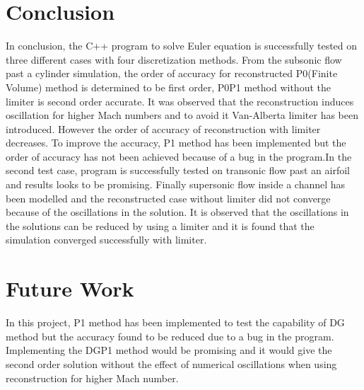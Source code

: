 \documentclass[12pt]{elsarticle}
\begin{document}
	\clearpage
	\section{Conclusion}
	In conclusion, the C++ program to solve Euler equation is successfully tested on three different cases with four discretization methods. From the subsonic flow past a cylinder simulation, the order of accuracy for reconstructed P0(Finite Volume) method is determined to be first order, P0P1 method without the limiter is second order accurate. It was observed that the reconstruction induces oscillation for higher Mach numbers and to avoid it Van-Alberta limiter has been introduced. However the order of accuracy of reconstruction with limiter decreases. To improve the accuracy, P1 method has been implemented but the order of accuracy has not been achieved because of a bug in the program.In the second test case, program is successfully tested on transonic flow past an airfoil and results looks to be promising. Finally supersonic flow inside a channel has been modelled and the reconstructed case without limiter did not converge because of the oscillations in the solution. It is observed that the oscillations in the solutions can be reduced by using a limiter and it is found that the simulation converged successfully with limiter.
	
	\section{Future Work}
	In this project, P1 method has been implemented to test the capability of DG method but the accuracy found to be reduced due to a bug in the program. Implementing the DGP1 method would be promising and it would give the second order solution without the effect of numerical oscillations when using reconstruction for higher Mach number.
	
	
	
	
	
	
	
	
\end{document}
